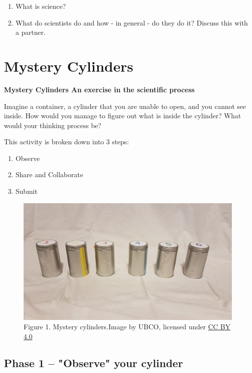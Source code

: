 \documentclass[
]{book}
\providecommand{\tightlist}{%
  \setlength{\itemsep}{0pt}\setlength{\parskip}{0pt}}
\begin{document}
\begin{enumerate}
\def\labelenumi{\arabic{enumi}.}
\tightlist
\item
  What is science?
\item
  What do scientists do and how - in general - do they do it? Discuss this with a partner.
\end{enumerate}

\hypertarget{mystery-cylinders}{%
\section*{Mystery Cylinders}\label{mystery-cylinders}}

\textbf{Mystery Cylinders An exercise in the scientific process}

Imagine a container, a cylinder that you are unable to open, and you cannot see inside. How would you manage to figure out what is inside the cylinder? What would your thinking process be?

This activity is broken down into 3 steps:

\begin{enumerate}
\def\labelenumi{\arabic{enumi}.}
\tightlist
\item
  Observe
\item
  Share and Collaborate
\item
  Submit
\end{enumerate}

\begin{figure}
\centering
\includegraphics{figures_images/Lab2a-Fig1.jpg}
\caption{Figure 1. Mystery cylinders.Image by UBCO, licensed under \href{https://creativecommons.org/licenses/by/4.0/}{CC BY 4.0}}
\end{figure}

\hypertarget{phase-1-observe-your-cylinder}{%
\subsection*{Phase 1 -- "Observe" your cylinder}\label{phase-1-observe-your-cylinder}}
\end{document}

